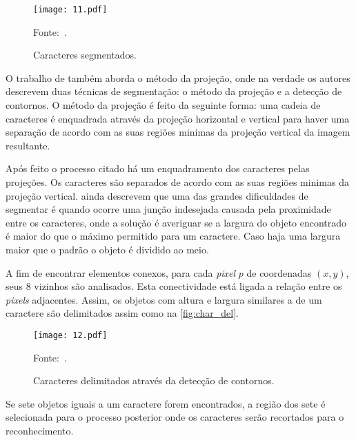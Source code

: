 \begin{figure}[htb]
	\centering
	\caption{{\footnotesize Caracteres segmentados.}}   %
	\label{fig:char_seg}
	\texttt{[image: 11.pdf]}
	
	{\footnotesize Fonte:~.}
\end{figure}

O trabalho de  também aborda o método da projeção, onde na verdade os autores descrevem duas técnicas de segmentação: o método da projeção e a detecção de contornos. O método da projeção é feito da seguinte forma: uma cadeia de caracteres é enquadrada através da projeção horizontal e vertical para haver uma separação de acordo com as suas regiões minimas da projeção vertical da imagem resultante.

Após feito o processo citado há um enquadramento dos caracteres pelas projeções. Os caracteres são separados de acordo com as suas regiões minimas da projeção vertical. \cite{ikeizumie2014} ainda descrevem que uma das grandes dificuldades de segmentar é quando ocorre uma junção indesejada causada pela proximidade entre os caracteres, onde a solução é averiguar se a largura do objeto encontrado é maior do que o máximo permitido para um caractere. Caso haja uma largura maior que o padrão o objeto é dividido ao meio.

A fim de encontrar elementos conexos, para cada \emph{pixel} $p$ de coordenadas $(x,y)$, seus 8 vizinhos são analisados. Esta conectividade está ligada a relação entre os \emph{pixels} adjacentes. Assim, os objetos com altura e largura similares a de um caractere são delimitados assim como na \autoref{fig:char_del}. 

\begin{figure}[htb]
	\centering
	\caption{{\footnotesize Caracteres delimitados através da detecção de contornos.}}   %
	\label{fig:char_del}
	\texttt{[image: 12.pdf]}
	
	{\footnotesize Fonte:~.}
\end{figure}

Se sete objetos iguais a um caractere forem encontrados, a região dos sete é selecionada para o processo posterior onde os caracteres serão recortados para o reconhecimento. 

